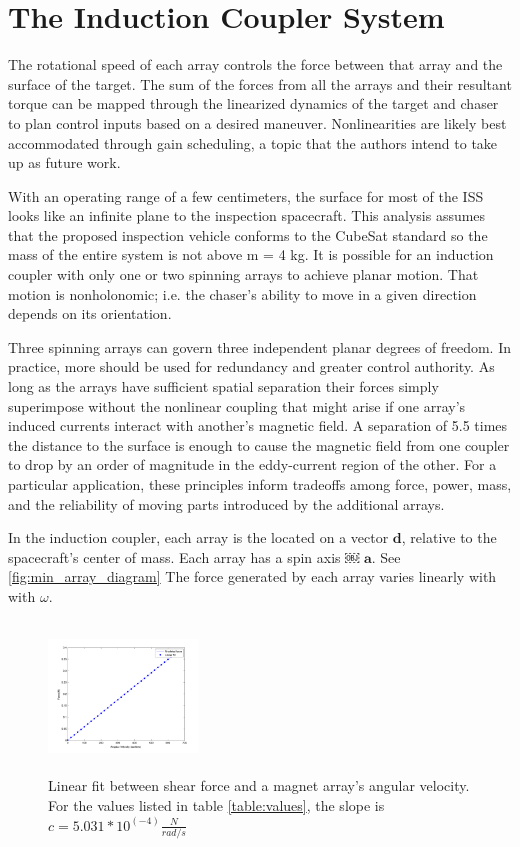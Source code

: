 \section{The Induction Coupler System}

The rotational speed of each array controls the force between that array and the surface of the target. The sum of the forces from all the arrays and their resultant torque can be mapped through the linearized dynamics of the target and chaser to plan control inputs based on a desired maneuver. Nonlinearities are likely best accommodated through gain scheduling, a topic that the authors intend to take up as future work.

With an operating range of a few centimeters, the surface for most of the ISS looks like an infinite plane to the inspection spacecraft. This analysis assumes that the proposed inspection vehicle conforms to the CubeSat standard so the mass of the entire system is not above m = 4 kg.
It is possible for an induction coupler with only one or two spinning arrays to achieve planar motion. That motion is nonholonomic; i.e. the chaser’s ability to move in a given direction depends on its orientation.

Three spinning arrays can govern three independent planar degrees of freedom. In practice, more should be used for redundancy and greater control authority. As long as the arrays have sufficient spatial separation their forces simply superimpose without the nonlinear coupling that might arise if one array’s induced currents interact with another’s magnetic field. A separation of 5.5 times the distance to the surface is enough to cause the magnetic field from one coupler to drop by an order of magnitude in the eddy-current region of the other. For a particular application, these principles inform tradeoffs among force, power, mass, and the reliability of moving parts introduced by the additional arrays.

In the induction coupler, each array is the located on a vector $\boldsymbol{d}$, relative to the spacecraft's center of mass. Each array has a spin axis ￼ $\boldsymbol{a}$. See \ref{fig:min_array_diagram} The force generated by each array varies linearly with with $\omega$.

\begin{figure}
\label{fig:lin_fit}
\includegraphics[width = 4cm, height = 4cm ]{figures/lin_fit.png}
\caption{Linear fit between shear force and a magnet array's angular velocity. For the values listed in table \ref{table:values}, the slope is $c = 5.031 * 10^(-4) \frac{N}{rad/s}$}
\end{figure}

